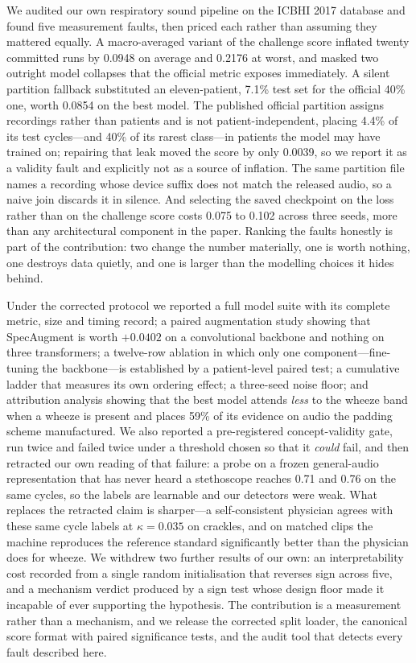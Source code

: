\documentclass[journal,onecolumn]{IEEEtran}
\begin{document}
We audited our own respiratory sound pipeline on the ICBHI 2017 database and found
five measurement faults, then priced each rather than assuming they mattered
equally. A macro-averaged variant of the challenge score inflated twenty committed
runs by 0.0948 on average and 0.2176 at worst, and masked two outright model
collapses that the official metric exposes immediately. A silent partition fallback
substituted an eleven-patient, 7.1\% test set for the official 40\% one, worth
0.0854 on the best model. The published official partition assigns recordings
rather than patients and is not patient-independent, placing 4.4\% of its test
cycles---and 40\% of its rarest class---in patients the model may have trained on;
repairing that leak moved the score by only 0.0039, so we report it as a validity
fault and explicitly not as a source of inflation. The same partition file names a
recording whose device suffix does not match the released audio, so a naive join
discards it in silence. And selecting the saved checkpoint on the loss rather than
on the challenge score costs 0.075 to 0.102 across three seeds, more than any
architectural component in the paper. Ranking the faults honestly is part of the
contribution: two change the number materially, one is worth nothing, one destroys
data quietly, and one is larger than the modelling choices it hides behind.

Under the corrected protocol we reported a full model suite with its complete
metric, size and timing record; a paired augmentation study showing that
SpecAugment is worth $+0.0402$ on a convolutional backbone and nothing on three
transformers; a twelve-row ablation in which only one component---fine-tuning the
backbone---is established by a patient-level paired test; a cumulative ladder that
measures its own ordering effect; a three-seed noise floor; and attribution
analysis showing that the best model attends \emph{less} to the wheeze band when a
wheeze is present and places 59\% of its evidence on audio the padding scheme
manufactured. We also reported a pre-registered concept-validity gate, run twice
and failed twice under a threshold chosen so that it \emph{could} fail, and then
retracted our own reading of that failure: a probe on a frozen general-audio
representation that has never heard a stethoscope reaches 0.71 and 0.76 on the same
cycles, so the labels are learnable and our detectors were weak. What replaces the
retracted claim is sharper---a self-consistent physician agrees with these same
cycle labels at $\kappa = 0.035$ on crackles, and on matched clips the machine
reproduces the reference standard significantly better than the physician does for
wheeze. We withdrew two further results of our own: an interpretability cost
recorded from a single random initialisation that reverses sign across five, and a
mechanism verdict produced by a sign test whose design floor made it incapable of
ever supporting the hypothesis. The contribution is a measurement rather than a
mechanism, and we release the corrected split loader, the canonical score format
with paired significance tests, and the audit tool that detects every fault
described here.
\end{document}
